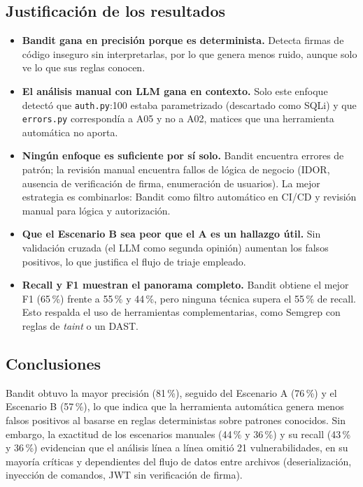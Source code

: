 \documentclass[11pt,letterpaper]{article}
\newcommand{\f}[1]{\texttt{#1}}
\begin{document}
\subsection{Justificación de los resultados}
\begin{itemize}
  \item \textbf{Bandit gana en precisión porque es determinista.} Detecta firmas de código inseguro sin interpretarlas, por lo que genera menos ruido, aunque solo ve lo que sus reglas conocen.
  \item \textbf{El análisis manual con LLM gana en contexto.} Solo este enfoque detectó que \f{auth.py}:100 estaba parametrizado (descartado como SQLi) y que \f{errors.py} correspondía a A05 y no a A02, matices que una herramienta automática no aporta.
  \item \textbf{Ningún enfoque es suficiente por sí solo.} Bandit encuentra errores de patrón; la revisión manual encuentra fallos de lógica de negocio (IDOR, ausencia de verificación de firma, enumeración de usuarios). La mejor estrategia es combinarlos: Bandit como filtro automático en CI/CD y revisión manual para lógica y autorización.
  \item \textbf{Que el Escenario B sea peor que el A es un hallazgo útil.} Sin validación cruzada (el LLM como segunda opinión) aumentan los falsos positivos, lo que justifica el flujo de triaje empleado.
  \item \textbf{Recall y F1 muestran el panorama completo.} Bandit obtiene el mejor F1 (65\,\%) frente a 55\,\% y 44\,\%, pero ninguna técnica supera el 55\,\% de recall. Esto respalda el uso de herramientas complementarias, como Semgrep con reglas de \textit{taint} o un DAST.
\end{itemize}

\subsection{Conclusiones}
Bandit obtuvo la mayor precisión (81\,\%), seguido del Escenario A (76\,\%) y el Escenario B (57\,\%), lo que indica que la herramienta automática genera menos falsos positivos al basarse en reglas deterministas sobre patrones conocidos. Sin embargo, la exactitud de los escenarios manuales (44\,\% y 36\,\%) y su recall (43\,\% y 36\,\%) evidencian que el análisis línea a línea omitió 21 vulnerabilidades, en su mayoría críticas y dependientes del flujo de datos entre archivos (deserialización, inyección de comandos, JWT sin verificación de firma).
\end{document}
